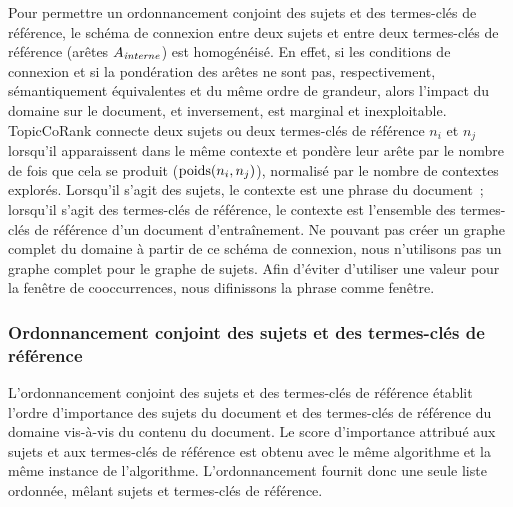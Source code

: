         Pour permettre un ordonnancement conjoint des sujets et des termes-clés
        de référence, le schéma de connexion entre deux sujets et entre deux
        termes-clés de référence (arêtes $A_\textnormal{\textit{interne}}$) est
        homogénéisé. En effet, si les conditions de connexion et si la
        pondération des arêtes ne sont pas, respectivement, sémantiquement
        équivalentes et du même ordre de grandeur, alors l'impact du domaine sur
        le document, et inversement, est marginal et inexploitable. TopicCoRank
        connecte deux sujets ou deux termes-clés de référence $n_i$ et $n_j$
        lorsqu'il apparaissent dans le même contexte et pondère leur arête par
        le nombre de fois que cela se produit ($\textnormal{poids}(n_i, n_j)$),
        normalisé par le nombre de contextes explorés. Lorsqu'il s'agit des
        sujets, le contexte est une phrase du document~; lorsqu'il s'agit des
        termes-clés de référence, le contexte est l'ensemble des termes-clés de
        référence d'un document d'entraînement. Ne pouvant pas créer un graphe
        complet du domaine à partir de ce schéma de connexion, nous n'utilisons
        pas un graphe complet pour le graphe de sujets. Afin d'éviter d'utiliser
        une valeur pour la fenêtre de cooccurrences, nous difinissons la phrase
        comme fenêtre.

      \subsubsection{Ordonnancement conjoint des sujets et des termes-clés de référence}
      \label{subsubsec:main-automatic_keyphrase_annotation-supervised_automatic_keyphrase_extraction-topiccorank-co_ranking}
        L'ordonnancement conjoint des sujets et des termes-clés de référence
        établit l'ordre d'importance des sujets du document et des termes-clés
        de référence du domaine vis-à-vis du contenu du document. Le score
        d'importance attribué aux sujets et aux termes-clés de référence est
        obtenu avec le même algorithme et la même instance de l'algorithme.
        L'ordonnancement fournit donc une seule liste ordonnée, mêlant sujets et
        termes-clés de référence.

